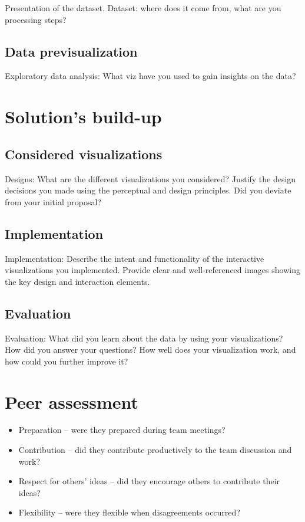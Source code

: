 \documentclass[a4paper,10pt]{article}
\begin{document}
Presentation of the dataset.
Dataset: where does it come from, what are you processing steps?

\subsection{Data previsualization}

Exploratory data analysis: What viz have you used to gain insights on the data?

\section{Solution's build-up}

\subsection{Considered visualizations}

Designs: What are the different visualizations you considered? Justify the design decisions you made using the perceptual and design principles.
Did you deviate from your initial proposal?

\subsection{Implementation}

Implementation: Describe the intent and functionality of the interactive visualizations you implemented. Provide clear and well-referenced images showing the key design and interaction elements.

\subsection{Evaluation}

Evaluation: What did you learn about the data by using your visualizations? How did you answer your questions? How well does your visualization work, and how could you further improve it?

\section{Peer assessment}

\begin{itemize}
  \item Preparation – were they prepared during team meetings?
  \item Contribution – did they contribute productively to the team discussion and work?
  \item Respect for others’ ideas – did they encourage others to contribute their ideas?
  \item Flexibility – were they flexible when disagreements occurred?
\end{itemize}
\end{document}
